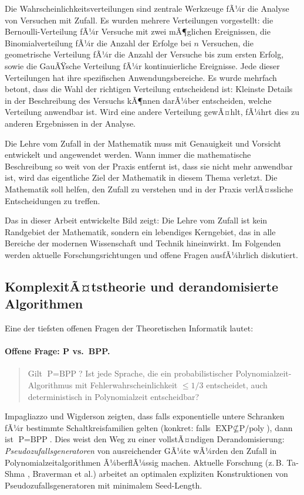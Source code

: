 ﻿\documentclass[12pt,a4paper]{article}
\theoremstyle{definition}
\theoremstyle{plain}
\theoremstyle{remark}
\begin{document}
Die Wahrscheinlichkeitsverteilungen sind zentrale Werkzeuge fÃ¼r die Analyse
von Versuchen mit Zufall. Es wurden mehrere Verteilungen vorgestellt: die
Bernoulli-Verteilung fÃ¼r Versuche mit zwei mÃ¶glichen Ereignissen, die
Binomialverteilung fÃ¼r die Anzahl der Erfolge bei $n$ Versuchen, die
geometrische Verteilung fÃ¼r die Anzahl der Versuche bis zum ersten Erfolg,
sowie die GauÃŸsche Verteilung fÃ¼r kontinuierliche Ereignisse. Jede dieser
Verteilungen hat ihre spezifischen Anwendungsbereiche. Es wurde mehrfach
betont, dass die Wahl der richtigen Verteilung entscheidend ist: Kleinste
Details in der Beschreibung des Versuchs kÃ¶nnen darÃ¼ber entscheiden, welche
Verteilung anwendbar ist. Wird eine andere Verteilung gewÃ¤hlt, fÃ¼hrt dies
zu anderen Ergebnissen in der Analyse.

Die Lehre vom Zufall in der Mathematik muss mit Genauigkeit und Vorsicht
entwickelt und angewendet werden. Wann immer die mathematische Beschreibung
so weit von der Praxis entfernt ist, dass sie nicht mehr anwendbar ist, wird
das eigentliche Ziel der Mathematik in diesem Thema verletzt. Die Mathematik
soll helfen, den Zufall zu verstehen und in der Praxis verlÃ¤ssliche
Entscheidungen zu treffen.

Das in dieser Arbeit entwickelte Bild zeigt: Die Lehre vom Zufall ist kein
Randgebiet der Mathematik, sondern ein lebendiges Kerngebiet, das in alle
Bereiche der modernen Wissenschaft und Technik hineinwirkt. Im Folgenden
werden aktuelle Forschungsrichtungen und offene Fragen ausfÃ¼hrlich diskutiert.

\subsection{KomplexitÃ¤tstheorie und derandomisierte Algorithmen}

Eine der tiefsten offenen Fragen der Theoretischen Informatik lautet:

\paragraph*{Offene Frage: P vs.\ BPP.}
\begin{quote}
  Gilt $\text{P} = \text{BPP}$? Ist jede Sprache, die ein
  probabilistischer Polynomialzeit-Algorithmus mit Fehlerwahrscheinlichkeit
  $\leq 1/3$ entscheidet, auch deterministisch in Polynomialzeit entscheidbar?
\end{quote}

Impagliazzo und Wigderson \cite{impagliazzo1997p} zeigten, dass falls
exponentielle untere Schranken fÃ¼r bestimmte Schaltkreisfamilien gelten
(konkret: falls $\text{EXP} \not\subseteq \text{P/poly}$), dann ist
$\text{P} = \text{BPP}$. Dies weist den Weg zu einer vollstÃ¤ndigen
Derandomisierung: \emph{Pseudozufallsgeneratoren} von ausreichender GÃ¼te
wÃ¼rden den Zufall in Polynomialzeitalgorithmen Ã¼berflÃ¼ssig machen. Aktuelle
Forschung (z.\,B. Ta-Shma \cite{tashma2017explicit}, Braverman et al.)
arbeitet an optimalen expliziten Konstruktionen von
Pseudozufallsgeneratoren mit minimalem Seed-Length.
\end{document}
